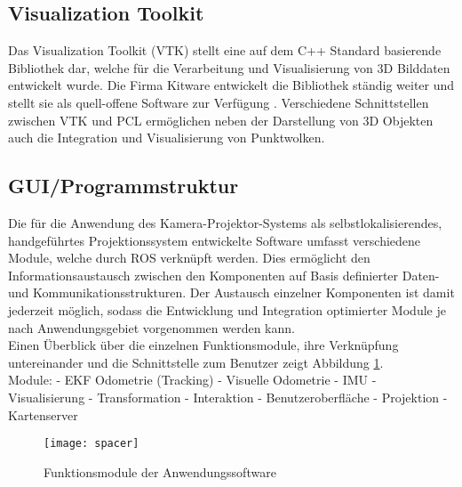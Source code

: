 \subsection{Visualization Toolkit}
Das Visualization Toolkit (VTK) stellt eine auf dem C++ Standard basierende Bibliothek dar, welche für die Verarbeitung und Visualisierung von 3D Bilddaten entwickelt wurde. Die Firma Kitware entwickelt die Bibliothek ständig weiter und stellt sie als quell-offene Software zur Verfügung \cite{VTK}. Verschiedene Schnittstellen zwischen VTK und PCL ermöglichen neben der Darstellung von 3D Objekten auch die Integration und Visualisierung von Punktwolken. \red[Ausführlicher?]

\subsection{GUI/Programmstruktur}
Die für die Anwendung des Kamera-Projektor-Systems als selbstlokalisierendes, handgeführtes Projektionssystem entwickelte Software umfasst verschiedene Module, welche durch ROS verknüpft werden. Dies ermöglicht den Informationsaustausch zwischen den Komponenten auf Basis definierter Daten- und Kommunikationsstrukturen. Der Austausch einzelner Komponenten ist damit jederzeit möglich, sodass die Entwicklung und Integration optimierter Module je nach Anwendungsgebiet vorgenommen werden kann.\\
Einen Überblick über die einzelnen Funktionsmodule, ihre Verknüpfung untereinander und die Schnittstelle zum Benutzer zeigt Abbildung \ref{fig.modules}.\\

Module: \mLocalization - EKF Odometrie (Tracking) - Visuelle Odometrie - IMU - Visualisierung - Transformation - Interaktion - Benutzeroberfläche - Projektion - Kartenserver\\

\begin{figure}[ht]
	\begin{center}
		\texttt{[image: spacer]}
		\caption{Funktionsmodule der Anwendungssoftware}
		\label{fig.modules}
	\end{center}
\end{figure}

